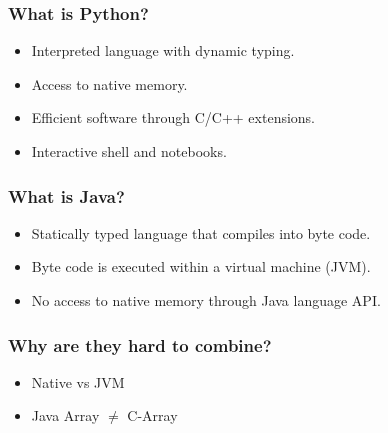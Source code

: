 \documentclass[%
]{beamer}
\begin{document}
\begin{frame}
    \frametitle{What is Python?}
    \begin{itemize}
          \item<1-> Interpreted language with dynamic typing.
          \item<1-> Access to native memory.
          \item<1-> Efficient software through C/C++ extensions.
          \item<1-> Interactive shell and notebooks.
    \end{itemize}
\end{frame}

\begin{frame}
    \frametitle{What is Java?}
    \begin{itemize}
          \item<1-> Statically typed language that compiles into byte code.
          \item<1-> Byte code is executed within a virtual machine (JVM).
          \item<1-> No access to native memory through Java language API.
    \end{itemize}
\end{frame}

\begin{frame}
    \frametitle{Why are they hard to combine?}
    \begin{itemize}
          \item Native vs JVM
          \item Java Array $\neq$ C-Array
    \end{itemize}
\end{frame}
\end{document}
